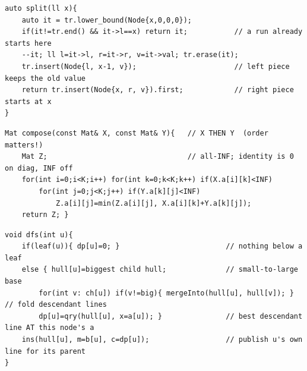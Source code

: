 \begin{lstlisting}[caption={Drill 3 -- ODT split: carve a run at a boundary (from lst:c29-896c)}]
auto split(ll x){
    auto it = tr.lower_bound(Node{x,0,0,0});
    if(it!=tr.end() && it->l==x) return it;           // a run already starts here
    --it; ll l=it->l, r=it->r, v=it->val; tr.erase(it);
    tr.insert(Node{l, x-1, v});                       // left piece keeps the old value
    return tr.insert(Node{x, r, v}).first;            // right piece starts at x
}
\end{lstlisting}

\begin{lstlisting}[caption={Drill 4 -- ordered (min,+) composition: the merge of a function tree (from lst:c29-func)}]
Mat compose(const Mat& X, const Mat& Y){   // X THEN Y  (order matters!)
    Mat Z;                                 // all-INF; identity is 0 on diag, INF off
    for(int i=0;i<K;i++) for(int k=0;k<K;k++) if(X.a[i][k]<INF)
        for(int j=0;j<K;j++) if(Y.a[k][j]<INF)
            Z.a[i][j]=min(Z.a[i][j], X.a[i][k]+Y.a[k][j]);
    return Z; }
\end{lstlisting}

\begin{lstlisting}[caption={Drill 5 -- tree-merged Li Chao DP: post-order, merge children, query, insert (from lst:c29-summit / lst:c29-cot6)}]
void dfs(int u){
    if(leaf(u)){ dp[u]=0; }                         // nothing below a leaf
    else { hull[u]=biggest child hull;              // small-to-large base
        for(int v: ch[u]) if(v!=big){ mergeInto(hull[u], hull[v]); }  // fold descendant lines
        dp[u]=qry(hull[u], x=a[u]); }               // best descendant line AT this node's a
    ins(hull[u], m=b[u], c=dp[u]);                  // publish u's own line for its parent
}
\end{lstlisting}

